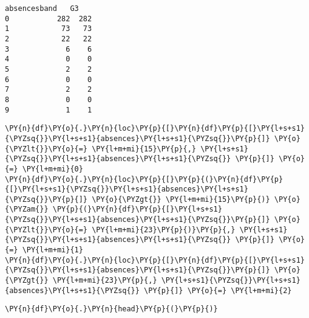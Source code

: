             \begin{tcolorbox}[breakable, size=fbox, boxrule=.5pt, pad at break*=1mm, opacityfill=0]
\begin{Verbatim}[commandchars=\\\{\}]
   absencesband   G3
0           282  282
1            73   73
2            22   22
3             6    6
4             0    0
5             2    2
6             0    0
7             2    2
8             0    0
9             1    1
\end{Verbatim}
\end{tcolorbox}
        
    \begin{tcolorbox}[breakable, size=fbox, boxrule=1pt, pad at break*=1mm,colback=cellbackground, colframe=cellborder]
\begin{Verbatim}[commandchars=\\\{\}]
\PY{n}{df}\PY{o}{.}\PY{n}{loc}\PY{p}{[}\PY{n}{df}\PY{p}{[}\PY{l+s+s1}{\PYZsq{}}\PY{l+s+s1}{absences}\PY{l+s+s1}{\PYZsq{}}\PY{p}{]} \PY{o}{\PYZlt{}}\PY{o}{=} \PY{l+m+mi}{15}\PY{p}{,} \PY{l+s+s1}{\PYZsq{}}\PY{l+s+s1}{absences}\PY{l+s+s1}{\PYZsq{}} \PY{p}{]} \PY{o}{=} \PY{l+m+mi}{0}
\PY{n}{df}\PY{o}{.}\PY{n}{loc}\PY{p}{[}\PY{p}{(}\PY{n}{df}\PY{p}{[}\PY{l+s+s1}{\PYZsq{}}\PY{l+s+s1}{absences}\PY{l+s+s1}{\PYZsq{}}\PY{p}{]} \PY{o}{\PYZgt{}} \PY{l+m+mi}{15}\PY{p}{)} \PY{o}{\PYZam{}} \PY{p}{(}\PY{n}{df}\PY{p}{[}\PY{l+s+s1}{\PYZsq{}}\PY{l+s+s1}{absences}\PY{l+s+s1}{\PYZsq{}}\PY{p}{]} \PY{o}{\PYZlt{}}\PY{o}{=} \PY{l+m+mi}{23}\PY{p}{)}\PY{p}{,} \PY{l+s+s1}{\PYZsq{}}\PY{l+s+s1}{absences}\PY{l+s+s1}{\PYZsq{}} \PY{p}{]} \PY{o}{=} \PY{l+m+mi}{1}
\PY{n}{df}\PY{o}{.}\PY{n}{loc}\PY{p}{[}\PY{n}{df}\PY{p}{[}\PY{l+s+s1}{\PYZsq{}}\PY{l+s+s1}{absences}\PY{l+s+s1}{\PYZsq{}}\PY{p}{]} \PY{o}{\PYZgt{}} \PY{l+m+mi}{23}\PY{p}{,} \PY{l+s+s1}{\PYZsq{}}\PY{l+s+s1}{absences}\PY{l+s+s1}{\PYZsq{}} \PY{p}{]} \PY{o}{=} \PY{l+m+mi}{2}
\end{Verbatim}
\end{tcolorbox}

    \begin{tcolorbox}[breakable, size=fbox, boxrule=1pt, pad at break*=1mm,colback=cellbackground, colframe=cellborder]
\begin{Verbatim}[commandchars=\\\{\}]
\PY{n}{df}\PY{o}{.}\PY{n}{head}\PY{p}{(}\PY{p}{)}
\end{Verbatim}
\end{tcolorbox}

